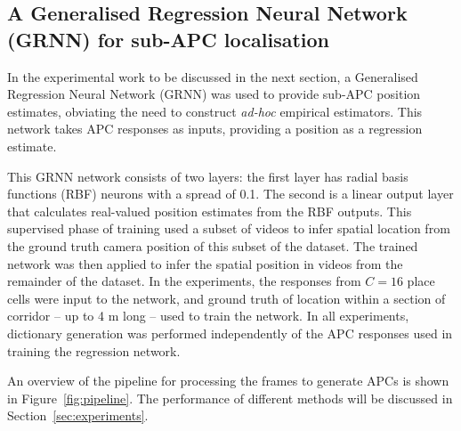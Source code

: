 



\subsection{A Generalised Regression Neural Network (GRNN) for sub-APC localisation}
\label{ch05:overview}
In the experimental work to be discussed in the next section, a Generalised Regression Neural Network (GRNN) was used to provide sub-APC position estimates, obviating the need to construct \textit{ad-hoc} empirical estimators. This network takes APC responses as inputs, providing a position as a regression estimate. 

This GRNN network consists of two layers: the first layer has radial basis functions (RBF) neurons with a spread of 0.1. The second is a linear output layer that calculates real-valued position estimates from the RBF outputs. This supervised phase of training used a subset of videos to infer spatial location from the ground truth camera position of this subset of the dataset.  The trained network was then applied to infer the spatial position in videos from the remainder of the dataset. In the experiments, the responses from $C = 16$ place cells were input to the network, and ground truth of location within a section of corridor -- up to 4 m long -- used to train the network.  In all experiments, dictionary generation was performed independently of the APC responses used in training the regression network. 

An overview of the pipeline for processing the frames to generate APCs is shown in Figure~\ref{fig:pipeline}. The performance of different methods will be discussed in Section~\ref{sec:experiments}.



